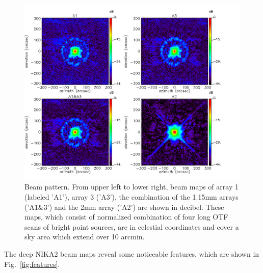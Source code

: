 \begin{figure}
\begin{center}
  \includegraphics[clip, angle=0, scale=0.4]{Figures/Lobe_map_Combo_v2_dB.pdf}
 \caption{Beam pattern. From upper left to lower right, beam maps of array 1 (labeled 'A1'), array 3 ('A3'), the combination of the 1.15mm arrays ('A1$\&$3') and the 2mm array ('A2') are shown in decibel. These maps, which consist of normalized combination of four long OTF scans of bright point sources, are in celestial coordinates and cover a sky area which extend over 10 arcmin.}
\label{fig:beam}
\end{center}
\end{figure}


The deep NIKA2 beam maps reveal some noticeable features, which are shown in Fig.~\ref{fig:features}. 

